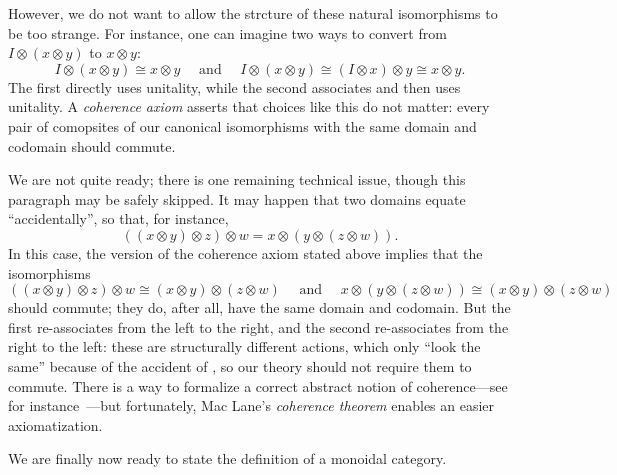However, we do not want to allow the strcture of these natural isomorphisms to
be too strange. For instance, one can imagine two ways to convert from $I\otimes (x\otimes y)$
to $x\otimes y$: \[
  I\otimes(x\otimes y) \cong x\otimes y \quad\text{ and }\quad
  I\otimes(x\otimes y) \cong (I\otimes x)\otimes y \cong x\otimes y.
\]The first directly uses unitality, while the second associates and then uses
unitality. A \emph{coherence axiom} asserts that choices like this do not
matter: every pair of comopsites of our canonical isomorphisms with the same
domain and codomain should commute.

We are not quite ready; there is one remaining technical issue, though this
paragraph may be safely skipped. It may happen that two
domains equate ``accidentally'', so that, for instance,
\begin{equation}\label{eqn:accidental equality}
  ((x\otimes y)\otimes z)\otimes w = x\otimes(y\otimes(z\otimes w)).
\end{equation}
In this case, the version of the coherence axiom stated above implies that the
isomorphisms \[
  ((x\otimes y)\otimes z)\otimes w \cong (x\otimes y)\otimes (z\otimes w)
  \quad\text{ and }\quad
  x\otimes(y\otimes(z\otimes w)) \cong (x\otimes y)\otimes (z\otimes w)
\] should commute; they do, after all, have the same domain and codomain. But
the first re-associates from the left to the right, and the second re-associates
from the right to the left: these are structurally different actions, which only
``look the same'' because of the accident of ,
so our theory should not require them to commute. There is a way to formalize
a correct abstract notion of coherence---see for instance~\cite[subsection
VII.2]{maclane-1971}---but fortunately, Mac Lane's \emph{coherence theorem}
enables an easier axiomatization.

We are finally now ready to state the definition of a monoidal category.


